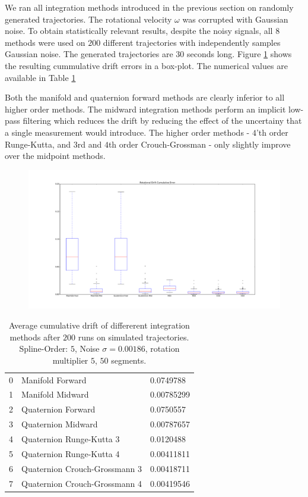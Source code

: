 \documentclass[10pt,a4paper]{article}
\numberwithin{equation}{section}
\begin{document}
We ran all integration methods introduced in the previous section on randomly generated trajectories.
The rotational velocity $\omega$ was corrupted with Gaussian noise.
To obtain statistically relevant results, despite the noisy signals, all $8$ methods were used on $200$ different trajectories with independently samples Gaussian noise. The generated trajectories are $30$ seconds long.
Figure \ref{fig:rotation_integration_drift_boxplot} shows the resulting cummulative drift errors in a box-plot. The numerical values are available in Table \ref{tbl:rotation_integration_drift}

Both the manifold and quaternion forward methods are clearly inferior to all higher order methods.
The midward integration methods perform an implicit low-pass filtering which reduces the drift by reducing the effect of the uncertainy that a single measurement would introduce.
The higher order methods - $4$'th order Runge-Kutta, and $3$rd and $4$th order Crouch-Grossman - only slightly improve over the midpoint methods.

\begin{figure}
\includegraphics[width=14cm]{figures/rotation_integration_drift_boxplot.pdf}
\caption{}
\label{fig:rotation_integration_drift_boxplot}
\end{figure}	

\begin{table}
\begin{center}
\begin{tabular}{ l | l || l }
0  & Manifold Forward &  0.0749788\\
1  & Manifold Midward &  0.00785299 \\
2  & Quaternion Forward &  0.0750557 \\
3  & Quaternion Midward & 0.00787657\\
4  & Quaternion Runge-Kutta 3 & 0.0120488 \\
5  & Quaternion Runge-Kutta 4 & 0.00411811 \\
6  & Quaternion Crouch-Grossmann 3 & 0.00418711\\
7  & Quaternion Crouch-Grossmann 4 & 0.00419546
\end{tabular}
\end{center}
\caption{Average cumulative drift of differerent integration methods after $200$ runs on simulated trajectories. Spline-Order: $5$, Noise $\sigma = 0.00186$, rotation multiplier $5$, $50$ segments.}
\label{tbl:rotation_integration_drift}
\end{table}
\end{document}
